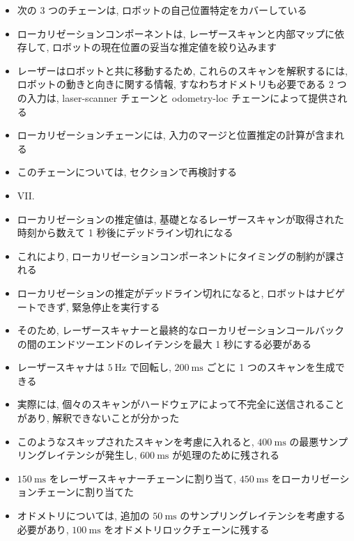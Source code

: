\begin{frame}{}
    \begin{itemize}
        \item 次の 3 つのチェーンは, ロボットの自己位置特定をカバーしている
\item ローカリゼーションコンポーネントは, レーザースキャンと内部マップに依存して, ロボットの現在位置の妥当な推定値を絞り込みます
\item レーザーはロボットと共に移動するため, これらのスキャンを解釈するには, ロボットの動きと向きに関する情報, すなわちオドメトリも必要である 2 つの入力は, laser-scanner チェーンと odometry-loc チェーンによって提供される
\item ローカリゼーションチェーンには, 入力のマージと位置推定の計算が含まれる
\item このチェーンについては, セクションで再検討する
\item VII.
    \end{itemize}
\end{frame}

\begin{frame}{}
    \begin{itemize}
        \item ローカリゼーションの推定値は, 基礎となるレーザースキャンが取得された時刻から数えて 1 秒後にデッドライン切れになる
\item これにより, ローカリゼーションコンポーネントにタイミングの制約が課される
\item ローカリゼーションの推定がデッドライン切れになると, ロボットはナビゲートできず, 緊急停止を実行する
\item そのため, レーザースキャナーと最終的なローカリゼーションコールバックの間のエンドツーエンドのレイテンシを最大 1 秒にする必要がある
    \end{itemize}
\end{frame}

\begin{frame}{}
    \begin{itemize}
        \item レーザースキャナは $5 \mathrm{~Hz}$ で回転し, $200 \mathrm{~ms}$ ごとに 1 つのスキャンを生成できる
\item 実際には, 個々のスキャンがハードウェアによって不完全に送信されることがあり, 解釈できないことが分かった
\item このようなスキップされたスキャンを考慮に入れると, $400 \mathrm{~ms}$ の最悪サンプリングレイテンシが発生し, $600 \mathrm{~ms}$ が処理のために残される
\item $150 \mathrm{~ms}$ をレーザースキャナーチェーンに割り当て, $450 \mathrm{~ms}$ をローカリゼーションチェーンに割り当てた
\item オドメトリについては, 追加の $50 \mathrm{~ms}$ のサンプリングレイテンシを考慮する必要があり, $100 \mathrm{~ms}$ をオドメトリロックチェーンに残する
    \end{itemize}
\end{frame}

